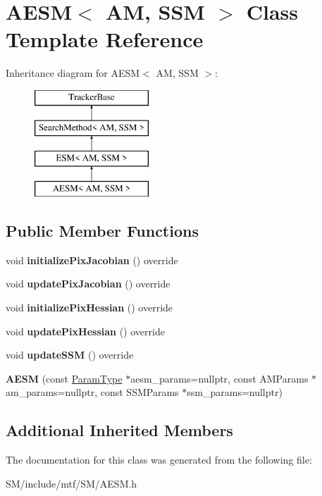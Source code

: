 \hypertarget{classAESM}{\section{A\-E\-S\-M$<$ A\-M, S\-S\-M $>$ Class Template Reference}
\label{classAESM}
}
Inheritance diagram for A\-E\-S\-M$<$ A\-M, S\-S\-M $>$\-:\begin{figure}[H]
\begin{center}
\leavevmode
\includegraphics[height=4.000000cm]{classAESM}
\end{center}
\end{figure}
\subsection*{Public Member Functions}
\begin{DoxyCompactItemize}
\item 
\hypertarget{classAESM_a7525ca85a79620f13bb29f55c043eb97}{void {\bfseries initialize\-Pix\-Jacobian} () override}\label{classAESM_a7525ca85a79620f13bb29f55c043eb97}

\item 
\hypertarget{classAESM_a6ddd36d5701e6ddb42e8342db238ad0d}{void {\bfseries update\-Pix\-Jacobian} () override}\label{classAESM_a6ddd36d5701e6ddb42e8342db238ad0d}

\item 
\hypertarget{classAESM_ad38415c52002f031ef78a4df0460861d}{void {\bfseries initialize\-Pix\-Hessian} () override}\label{classAESM_ad38415c52002f031ef78a4df0460861d}

\item 
\hypertarget{classAESM_a2abdab2cf7e6dd7d14f2d1e1511f8207}{void {\bfseries update\-Pix\-Hessian} () override}\label{classAESM_a2abdab2cf7e6dd7d14f2d1e1511f8207}

\item 
\hypertarget{classAESM_a28ad88c21366cf0193782b03ffc6bcea}{void {\bfseries update\-S\-S\-M} () override}\label{classAESM_a28ad88c21366cf0193782b03ffc6bcea}

\item 
\hypertarget{classAESM_a0e42d24b4f923295ef6b5899f2fbd669}{{\bfseries A\-E\-S\-M} (const \hyperlink{structESMParams}{Param\-Type} $\ast$aesm\-\_\-params=nullptr, const A\-M\-Params $\ast$am\-\_\-params=nullptr, const S\-S\-M\-Params $\ast$ssm\-\_\-params=nullptr)}\label{classAESM_a0e42d24b4f923295ef6b5899f2fbd669}

\end{DoxyCompactItemize}
\subsection*{Additional Inherited Members}


The documentation for this class was generated from the following file\-:\begin{DoxyCompactItemize}
\item 
S\-M/include/mtf/\-S\-M/A\-E\-S\-M.\-h\end{DoxyCompactItemize}
